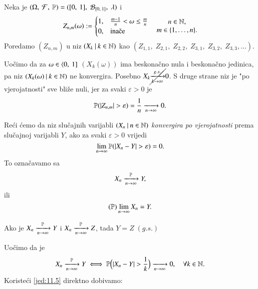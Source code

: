 \begin{pr}  \label{pr:11.13}
    Neka je $(\Omega, \: \mathcal{F}, \: \mathbb{P}) = ([{0}, \:{1}], \; \mathcal{B}_{[{0}, \:{1}]}, \; \lambda)$ i
    \begin{equation*}
        Z_{n, m} (\omega) :=
        \begin{cases}
            1, &\frac{m-1}{n} < \omega \leq \frac{m}{n}\\
            0, &\textnormal{ina\v ce}
        \end{cases}
        \quad
        \begin{matrix}
            n \in \nat,\\
            m \in \{ 1, \ldots, n \}.
        \end{matrix}
    \end{equation*}
    Poredamo $(Z_{n, m})$ u niz $({X_k} \: | \: {k \in \mathbb{N}})$ kao $(Z_{1,1}, \; Z_{2,1}, \; Z_{2, 2}, \; Z_{3,1}, \; Z_{3,2}, \; Z_{3,3}, \ldots)$.

    Uo\v cimo da za $\omega \in \langle {0}, \: {1}]$ $(X_k (\omega))$ ima beskona\v cno nula i beskona\v cno jedinica, pa niz $({X_k (\omega)} \: | \: {k \in \mathbb{N}})$ ne konvergira.
    Posebno $X_k \cancel{\xrightarrow[k \to \infty]{g.s.}} 0$.
    S druge strane niz je "po vjerojatnosti" sve bli\v ze nuli, jer za svaki $\varepsilon > 0$ je
    \begin{equation*}
        \mathbb{P}({|Z_{n, m}| > \varepsilon}) = \frac{1}{n} \xrightarrow[n \to \infty]{} 0.
    \end{equation*} 
\end{pr}

\begin{defn}    \label{defn:11.13-1}
    Re\' ci \' cemo da niz slu\v cajnih varijabli $({X_n} \: | \: {n \in \mathbb{N}})$ \emph{konvergira po vjerojatnosti} prema slu\v cajnoj varijabli $Y$, ako za svaki $\varepsilon > 0$ vrijedi
    \begin{equation*}
        \lim\limits_{n \to \infty} \mathbb{P}({|X_n - Y| > \varepsilon}) = 0.
    \end{equation*}
    To ozna\v cavamo sa
    \begin{equation*}
        X_n \xrightarrow[n \to \infty]{\mathbb{P}} Y,
    \end{equation*}
    ili
    \begin{equation*}
        (\mathbb{P}) \lim\limits_{n \to \infty} X_n = Y.
    \end{equation*}
\end{defn}

\begin{zad} \label{zad:11.14}
    Ako je $X_n \xrightarrow[n \to \infty]{\mathbb{P}} Y$ i $X_n \xrightarrow[n \to \infty]{\mathbb{P}} Z$, tada $Y =  Z \; (g.s.)$
\end{zad}
Uo\v cimo da je
\begin{equation}    \label{jed:11.15}
    X_n \xrightarrow[n \to \infty]{\mathbb{P}} Y \iff \mathbb{P} \Big( |X_n - Y| > \frac{1}{k} \Big) \xrightarrow[n \to \infty]{} 0, \quad \forall k \in \mathbb{N}.
\end{equation}
Koriste\' ci \eqref{jed:11.5} direktno dobivamo:

